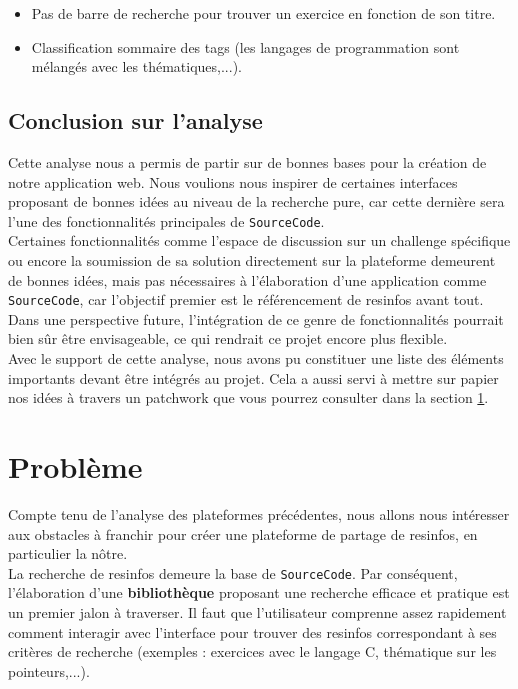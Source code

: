 \begin{itemize}
    \item Pas de barre de recherche pour trouver un exercice en fonction de son titre.
    \item Classification sommaire des \glspl{tag} (les langages de programmation sont mélangés avec les thématiques,...).
\end{itemize}

\subsection*{Conclusion sur l'analyse}

Cette analyse nous a permis de partir sur de bonnes bases pour la création de notre application web. Nous voulions nous inspirer de certaines interfaces proposant de bonnes idées au niveau de la recherche pure, car cette dernière sera l'une des fonctionnalités principales de \texttt{SourceCode}. \\

Certaines fonctionnalités comme l'espace de discussion sur un challenge spécifique ou encore la soumission de sa solution directement sur la plateforme demeurent de bonnes idées, mais pas nécessaires à l'élaboration d'une application comme \texttt{SourceCode}, car l'objectif premier est le référencement de \glspl{resinfo} avant tout. Dans une perspective future, l'intégration de ce genre de fonctionnalités pourrait bien sûr être envisageable, ce qui rendrait ce projet encore plus flexible.\\

Avec le support de cette analyse, nous avons pu constituer une liste des éléments importants devant être intégrés au projet. Cela a aussi servi à mettre sur papier nos idées à travers un patchwork que vous pourrez consulter dans la section \ref{section:problem}.


\section{Problème}
\label{section:problem}

Compte tenu de l'analyse des plateformes précédentes, nous allons nous intéresser aux obstacles à franchir pour créer une plateforme de partage de \glspl{resinfo}, en particulier la nôtre.\\

La recherche de \glspl{resinfo} demeure la base de \texttt{SourceCode}. Par conséquent, l'élaboration d'une \textbf{bibliothèque} proposant une recherche efficace et pratique est un premier jalon à traverser. Il faut que l'utilisateur comprenne assez rapidement comment interagir avec l'interface pour trouver des \glspl{resinfo} correspondant à ses critères de recherche (exemples : exercices avec le langage C, thématique sur les pointeurs,...).\\

